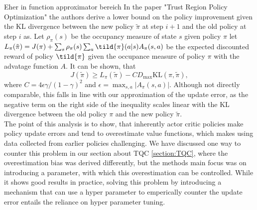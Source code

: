 Eher in function approximator bereich
In the paper "Trust Region Policy Optimization" \cite{TRPO} the authors derive a lower bound on the policy improvement given the KL divergence between the new policy $\tilde{\pi}$ 
at step $i+1$ and the old policy at step $i$ as. Let $\rho_{\pi}(s)$ be the occupancy measure of state $s$ given policy 
$\pi$ let $L_{\pi}(\tilde{\pi}) = J(\pi) + \sum_s \rho_{\pi}(s) \sum_a \tild{\pi}(a|s) A_\pi(s,a)$ 
be the expected discounted reward of policy $\tild{\pi}$ given the occupance measure of policy $\pi$ with the advatage function $A$. It can be shown, that 
\begin{equation}
    J(\tilde{\pi}) \geq L_\pi(\tilde{\pi}) - C D_{\max} \mathrm{KL}(\pi, \tilde{\pi}),
\end{equation}
where $C = 4\epsilon\gamma/(1-\gamma)^2$ and $\epsilon = \max_{s,a} |A_\pi(s,a)|$. Although not directly comparable, this falls in line with our approximation of the update error, as 
the negative term on the right side of the inequality scales linear with the KL divergence between the old policy $\pi$ and the new policy $\tilde{\pi}$. \\
The point of this analysis is to show, that inherently actor critic policies make policy update errors and tend to overestimate value functions, 
which makes using data collected from earlier policies challenging. We have discussed one way to counter this problem in our section about TQC \ref{section:TQC}, 
where the overestimation bias was derived differently, but the methods main focus was on introducing a parameter, with which this overestimation can be controlled. 
While it shows good results in practice, solving this problem by introducing a mechanism that can use a hyper parameter to emperically counter the update error 
entails the reliance on hyper parameter tuning. \\


